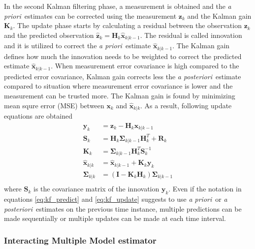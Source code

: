 \documentclass[english, 12pt, a4paper, elec, utf8, a-1b, online]{aaltothesis}
\renewcommand{\vec}[1]{\mathbf{#1}}
\newcommand{\inv}[1]{#1^{-1}}
\newcommand{\xprior}{\hat{\vec{x}}_{k|k-1}}
\newcommand{\xpost}{\hat{\vec{x}}_{k|k}}
\newcommand{\priorecov}{\boldsymbol{\Sigma}_{k|k-1}}
\newcommand{\postecov}{\boldsymbol{\Sigma}_{k|k}}
\newcommand{\prefitinnov}{\vec{y}_k}
\newcommand{\x}{\vec{x}_k}
\newcommand{\z}{\vec{z}_k}
\newcommand{\omodel}{\vec{H}_k}
\newcommand{\ocov}{\vec{R}_k}
\newcommand{\innocov}{\vec{S}_k}
\newcommand{\eye}{\vec{I}}
\newcommand{\gain}{\vec{K}_k}
\def\prior{\textit{a priori}\ }
\def\post{\textit{a posteriori}\ }
\newcommand{\zhat}{\hat{\vec{z}}_k}
\begin{document}
In the second Kalman filtering phase, a measurement is obtained and the \prior estimates can be corrected using the measurement $\z$ and the Kalman gain $\gain$.
The update phase starts by calculating a residual between the observation $\z$ and the predicted observation $\zhat = \omodel \xprior$.
The residual is called innovation and it is utilized to correct the \prior estimate $\xprior$.
The Kalman gain defines how much the innovation needs to be weighted to correct the predicted estimate $\xprior$.
When measurement error covariance is high compared to the predicted error covariance, Kalman gain corrects less the \post estimate compared to situation where measurement error covariance is lower and the measurement can be trusted more. 
The Kalman gain is found by minimizing mean squre error (MSE) between $\x$ and $\xpost$.
As a result, following update equations are obtained
\begin{subequations}
\label{eq:kf_update}
\begin{align}
    \prefitinnov &= \z - \omodel \xprior \label{eq:kf_prefit_innov}\\ 
    \innocov &= \omodel \priorecov \omodel^T + \ocov \label{eq:kf_innov_cov}\\ 
    \gain &= \priorecov \omodel^T \inv{\innocov} \label{eq:kf_gain}\\ 
    \xpost &= \xprior + \gain \prefitinnov \label{eq:kf_update_x}\\ 
    \postecov &= \left( \eye - \gain \omodel \right) \priorecov  \label{eq:kf_post_error_cov}\\
\end{align}
\end{subequations}
where $\innocov$ is the covariance matrix of the innovation $\prefitinnov$. 
Even if the notation in equations \eqref{eq:kf_predict} and \eqref{eq:kf_update} suggests to use \prior or \post estimates on the previous time instance, multiple predictions can be made sequentially or multiple updates can be made at each time interval.

\subsubsection{Interacting Multiple Model estimator}
\label{sec:IMM}
\end{document}
